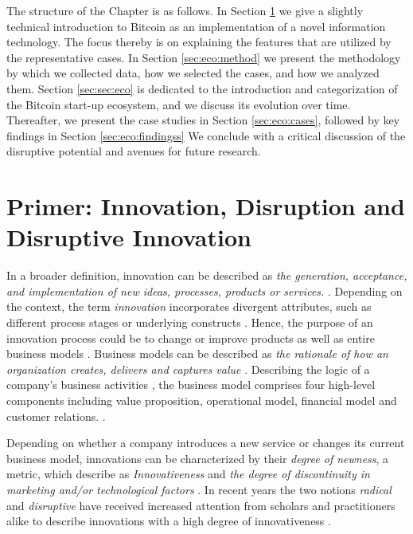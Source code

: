 The structure of the Chapter is as follows. In Section \ref{sec:eco:primer} we give a slightly technical 
introduction to Bitcoin as an implementation of a novel information technology. 
The focus thereby is on explaining the features that are utilized by the representative 
cases. In Section \ref{sec:eco:method} we present the methodology by which we collected data, how 
we selected the cases, and how we analyzed them. Section \ref{sec:sec:eco} is dedicated to the 
introduction and categorization of the Bitcoin start-up ecosystem, and we discuss 
its evolution over time. Thereafter, we present the case studies in Section \ref{sec:eco:cases}, 
followed by key findings in Section \ref{sec:eco:findingss} We conclude with a critical discussion of 
the disruptive potential and avenues for future research.

\section{Primer: Innovation, Disruption and Disruptive Innovation}
\label{sec:eco:primer}

In a broader definition, innovation can be described as \emph{the generation, acceptance, 
and implementation of new ideas, processes, products or services.} \parencite[][2]{10.2307/2391646}. Depending on the context, the term \emph{innovation} incorporates divergent 
attributes, such as different process stages or underlying constructs \parencite{doi:10.1108/00251740910984578}. Hence, the purpose of an innovation process could be to change or 
improve products as well as entire business models \parencite{CAIM:CAIM637}. Business 
models can be described as \emph{the rationale of how an organization creates, delivers 
and captures value} \parencite{osterwalder2010business}. Describing the logic of a 
company's business activities \parencite{linder2000so}, the business model comprises 
four high-level components including value proposition, operational model, financial 
model and customer relations. \parencite{CAIM:CAIM637}. 

Depending on whether a company introduces a new service or changes its current 
business model, innovations can be characterized by their \emph{degree of newness}, 
a metric, which \cite{JPIM:JPIMJPIM192_0110.XML} describe as \emph{Innovativeness} and 
\emph{the degree of discontinuity in marketing and/or technological factors} \parencite[][112]{JPIM:JPIMJPIM192_0110.XML}. In recent years the two notions \emph{radical} and \emph{disruptive}
have received increased attention from scholars and practitioners alike to describe 
innovations with a high degree of innovativeness \parencite{Latzer01062009,christensen2015disruptive}. 


